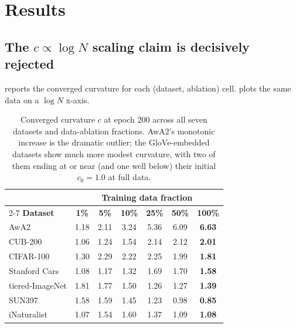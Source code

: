 \documentclass{article}
\begin{document}
\section{Results}\label{sec:results}

\subsection{The $c \propto \log N$ scaling claim is decisively rejected}\label{sec:logn_rejected}

 reports the converged curvature for each (dataset, ablation) cell.
 plots the same data on a $\log N$ x-axis.

\begin{table}[t]
\centering
\caption{Converged curvature $c$ at epoch 200 across all seven datasets and data-ablation fractions. AwA2's monotonic increase is the dramatic outlier; the GloVe-embedded datasets show much more modest curvature, with two of them ending at or near (and one well below) their initial $c_0 = 1.0$ at full data.}
\label{tab:curvature_all}
\begin{tabular}{lcccccc}
\toprule
 & \multicolumn{6}{c}{\textbf{Training data fraction}} \\
\cmidrule(lr){2-7}
\textbf{Dataset} & \textbf{1\%} & \textbf{5\%} & \textbf{10\%} & \textbf{25\%} & \textbf{50\%} & \textbf{100\%} \\
\midrule
AwA2            & 1.18 & 2.11 & 3.24 & 5.36 & 6.09 & \textbf{6.63} \\
CUB-200         & 1.06 & 1.24 & 1.54 & 2.14 & 2.12 & \textbf{2.01} \\
CIFAR-100       & 1.30 & 2.29 & 2.22 & 2.25 & 1.99 & \textbf{1.81} \\
Stanford Cars   & 1.08 & 1.17 & 1.32 & 1.69 & 1.70 & \textbf{1.58} \\
tiered-ImageNet & 1.81 & 1.77 & 1.50 & 1.26 & 1.27 & \textbf{1.39} \\
SUN397          & 1.58 & 1.59 & 1.45 & 1.23 & 0.98 & \textbf{0.85} \\
iNaturalist     & 1.07 & 1.54 & 1.60 & 1.37 & 1.09 & \textbf{1.08} \\
\bottomrule
\end{tabular}
\end{table}
\end{document}
